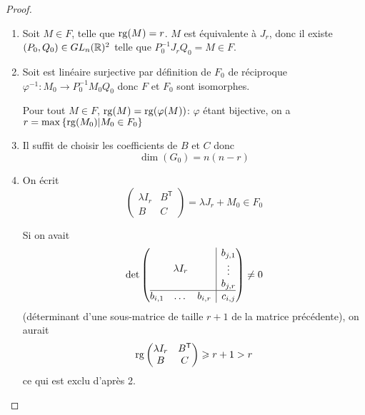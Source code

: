 \begin{proof}
    \phantom{}
    \begin{enumerate}
        \item Soit $M\in F$, telle que $\operatorname{rg}(M)=r$. $M$ est équivalente à $J_{r}$, donc il existe $(P_{0},Q_{0})\in GL_{n}(\mathbb{R})^{2}$ telle que $P_{0}^{-1}J_{r}Q_{0}=M\in F$.
        
        \item Soit 
        est linéaire surjective par définition de $F_{0}$ de réciproque $\varphi^{-1}\colon M_{0}\to P_{0}^{-1}M_{0}Q_{0}$ donc $F$ et $F_{0}$ sont isomorphes.

        Pour tout $M\in F$, $\operatorname{rg}(M)=\operatorname{rg}(\varphi(M))$: $\varphi$ étant bijective, on a $r=\max\left\lbrace\operatorname{rg}(M_{0})\middle| M_{0}\in F_{0}\right\rbrace$

        \item Il suffit de choisir les coefficients de $B$ et $C$ donc 
        \begin{equation}
            \boxed{\dim(G_{0})=n(n-r)}
        \end{equation}

        \item On écrit 
        \begin{equation}
            \begin{pmatrix}
                \lambda I_{r} & B^{\mathsf{T}}\\
                B & C
            \end{pmatrix}
            =\lambda J_{r}+M_{0}\in F_{0}
        \end{equation}

        Si on avait 
        \begin{equation}
            \det\left(
				\begin{array}{@{}c|c@{}}
				\lambda
				I_{r} &
				\begin{matrix}
				b_{j,1}\\
						\vdots\\
						b_{j,r}
						\end{matrix}
						\\
					\hline
					\begin{matrix}
						b_{i,1} &
						\dots
						& b_{i,r}
						\end{matrix}
						& c_{i,j}
				\end{array}
			\right)\neq0
        \end{equation}
        (déterminant d'une sous-matrice de taille $r+1$ de la matrice précédente), on aurait 
        \begin{equation}
            \operatorname{rg}\begin{pmatrix}
                \lambda I_{r} & B^{\mathsf{T}}\\
                B & C
            \end{pmatrix}\geqslant r+1>r
        \end{equation}
        ce qui est exclu d'après 2.


\end{enumerate}
\end{proof}
